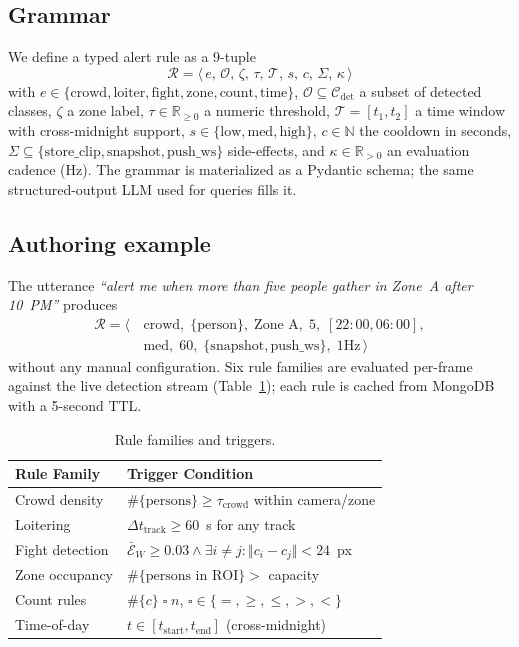 ﻿\documentclass[conference]{IEEEtran}
\theoremstyle{definition}
\begin{document}
\subsection{Grammar}
We define a typed alert rule as a 9-tuple
\[
\mathcal{R} = \langle\, e,\, \mathcal{O},\, \zeta,\, \tau,\, \mathcal{T},\, s,\, c,\, \Sigma,\, \kappa\,\rangle
\]
with $e\in\{\text{crowd}, \text{loiter}, \text{fight}, \text{zone}, \text{count}, \text{time}\}$, $\mathcal{O}\subseteq\mathcal{C}_{\text{det}}$ a subset of detected classes, $\zeta$ a zone label, $\tau\in\mathbb{R}_{\ge 0}$ a numeric threshold, $\mathcal{T}=[t_1,t_2]$ a time window with cross-midnight support, $s\in\{\text{low}, \text{med}, \text{high}\}$, $c\in\mathbb{N}$ the cooldown in seconds, $\Sigma\subseteq\{\text{store\_clip}, \text{snapshot}, \text{push\_ws}\}$ side-effects, and $\kappa\in\mathbb{R}_{>0}$ an evaluation cadence (Hz). The grammar is materialized as a Pydantic schema; the same structured-output LLM used for queries fills it.

\subsection{Authoring example}
The utterance \textit{``alert me when more than five people gather in Zone~A after 10~PM''} produces
\begin{align*}
\mathcal{R} = \langle\,&\text{crowd},\;\{\text{person}\},\;\text{Zone~A},\;5,\;[22{:}00,06{:}00],\\
&\text{med},\;60,\;\{\text{snapshot}, \text{push\_ws}\},\;\text{1Hz}\,\rangle
\end{align*}
without any manual configuration. Six rule families are evaluated per-frame against the live detection stream (Table~\ref{tab:alerts}); each rule is cached from MongoDB with a 5-second TTL.

\begin{table}[!t]
\caption{Rule families and triggers.}
\label{tab:alerts}
\centering
\footnotesize
\begin{tabular}{@{}p{2.4cm} p{5.2cm}@{}}
\toprule
Rule Family & Trigger Condition \\
\midrule
Crowd density & $\#\{\text{persons}\} \ge \tau_{\text{crowd}}$ within camera/zone \\
Loitering & $\Delta t_{\text{track}} \ge 60$~s for any track \\
Fight detection & $\bar{\mathcal{E}}_W \ge 0.03 \wedge \exists i\!\neq\!j: \Vert c_i-c_j\Vert<24$~px \\
Zone occupancy & $\#\{\text{persons in ROI}\} > $ capacity \\
Count rules & $\#\{c\} \;\square\; n$, $\square\in\{=,\ge,\le,>,<\}$ \\
Time-of-day & $t \in [t_{\text{start}},t_{\text{end}}]$ (cross-midnight) \\
\bottomrule
\end{tabular}
\end{table}
\end{document}
